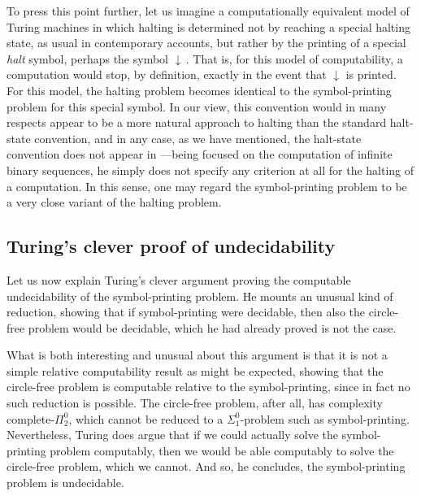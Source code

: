 \documentclass{amsart}
\begin{document}
\newcommand\halt{\boldsymbol{\downarrow}}
To press this point further, let us imagine a computationally equivalent model of Turing machines in which halting is determined not by reaching a special halting state, as usual in contemporary accounts, but rather by the printing of a special \emph{halt} symbol, perhaps the symbol $\halt$\,. That is, for this model of computability, a computation would stop, by definition, exactly in the event that $\halt$ is printed. For this model, the halting problem becomes identical to the symbol-printing problem for this special symbol. In our view, this convention would in many respects appear to be a more natural approach to halting than the standard halt-state convention, and in any case, as we have mentioned, the halt-state convention does not appear in \cite{Turing1936:On-computable-numbers}---being focused on the computation of infinite binary sequences, he simply does not specify any criterion at all for the halting of a computation. In this sense, one may regard the symbol-printing problem to be a very close variant of the halting problem. 

\subsection{Turing's clever proof of undecidability}

Let us now explain Turing's clever argument proving the computable undecidability of the symbol-printing problem. He mounts an unusual kind of reduction, showing that if symbol-printing were decidable, then also the circle-free problem would be decidable, which he had already proved is not the case. 

What is both interesting and unusual about this argument is that it is not a simple relative computability result as might be expected, showing that the circle-free problem is computable relative to the symbol-printing, since in fact no such reduction is possible. The circle-free problem, after all, has complexity complete-$\Pi^0_2$, which cannot be reduced to a $\Sigma^0_1$-problem such as symbol-printing. Nevertheless, Turing does argue that if we could actually solve the symbol-printing problem computably, then we would be able computably to solve the circle-free problem, which we cannot. And so, he concludes, the symbol-printing problem is undecidable. 
\end{document}
